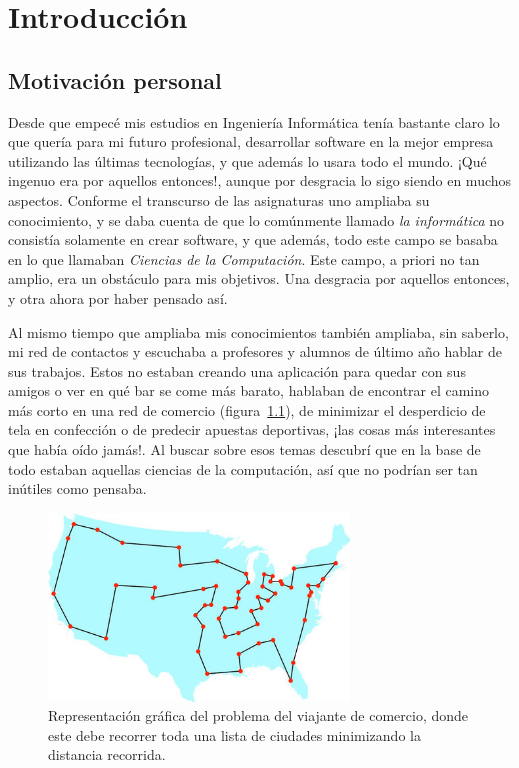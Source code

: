 \chapter{Introducción} \label{chap:1}

\vspace*{5mm}

\section{Motivación personal} \label{sec:1.1}

Desde que empecé mis estudios en Ingeniería Informática tenía bastante claro lo que quería para mi futuro profesional, desarrollar software en la mejor empresa utilizando las últimas tecnologías, y que además lo usara todo el mundo. ¡Qué ingenuo era por aquellos entonces!, aunque por desgracia lo sigo siendo en muchos aspectos. Conforme el transcurso de las asignaturas uno ampliaba su conocimiento, y se daba cuenta de que lo comúnmente llamado \emph{la informática} no consistía solamente en crear software, y que además, todo este campo se basaba en lo que llamaban \emph{Ciencias de la Computación}. Este campo, a priori no tan amplio, era un obstáculo para mis objetivos. Una desgracia por aquellos entonces, y otra ahora por haber pensado así.

Al mismo tiempo que ampliaba mis conocimientos también ampliaba, sin saberlo, mi red de contactos y escuchaba a profesores y alumnos de último año hablar de sus trabajos. Estos no estaban creando una aplicación para quedar con sus amigos o ver en qué bar se come más barato, hablaban de encontrar el camino más corto en una red de comercio (figura~\ref{fig:1.1}), de minimizar el desperdicio de tela en confección o de predecir apuestas deportivas, ¡las cosas más interesantes que había oído jamás!. Al buscar sobre esos temas descubrí que en la base de todo estaban aquellas ciencias de la computación, así que no podrían ser tan inútiles como pensaba.

\begin{figure}[ht]
    \centering
    \includegraphics[width=80mm]{figures/ch_01/tsp.jpg}
    \caption{Representación gráfica del problema del viajante de comercio, donde este debe recorrer toda una lista de ciudades minimizando la distancia recorrida. \cite{isherwood2012life}}
    \label{fig:1.1}
\end{figure}

